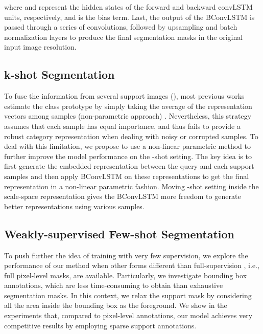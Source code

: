 \documentclass[runningheads]{llncs}
\begin{document}
where  and  represent the hidden states of the forward and backward convLSTM units, respectively, and  is the bias term. Last, the output of the BConvLSTM is passed through a series of convolutions, followed by upsampling and batch normalization layers to produce the final segmentation masks in the original input image resolution.








\subsection{k-shot Segmentation}
To fuse the information from several support images (), most previous works estimate the class prototype  by simply taking the average of the representation vectors among  samples (non-parametric approach) \cite{shaban2017one,zhang2018sg,siam2019amp}. Nevertheless, this strategy assumes that each  sample has equal importance, and thus fails to provide a robust category representation when dealing with noisy or corrupted samples. To deal with this limitation, we propose to use a non-linear parametric method to further improve the model performance on the -shot setting. The key idea is to first generate the embedded representation between the query and each  support samples and then apply BConvLSTM on these representations to get the final representation in a non-linear parametric fashion. Moving -shot setting inside the scale-space representation gives the BConvLSTM more freedom to generate better representations using various samples. 

\subsection{Weakly-supervised Few-shot Segmentation}


To push further the idea of training with very few supervision, we explore the performance of our method when other forms different than full-supervision , i.e., full pixel-level masks, 
are available. Particularly, we investigate bounding box annotations, which are less time-consuming to obtain than exhaustive segmentation masks. In this context, we relax the support mask by considering all the area inside the bounding box as the foreground. We show in the experiments that, compared to pixel-level annotations, our model achieves very competitive results by employing sparse support annotations.
\end{document}
